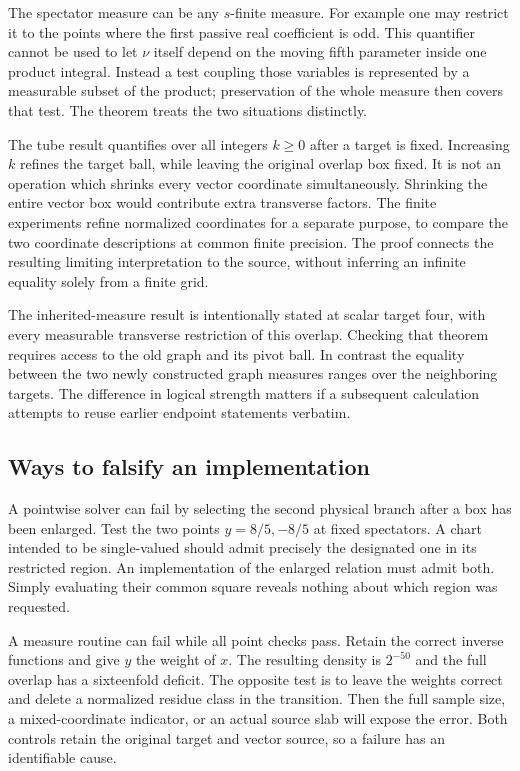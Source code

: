 \documentclass[12pt,letterpaper]{article}
\begin{document}
The spectator measure can be any $s$-finite measure. For example one may restrict it to the points where the first passive real coefficient is odd. This quantifier cannot be used to let $\nu$ itself depend on the moving fifth parameter inside one product integral. Instead a test coupling those variables is represented by a measurable subset of the product; preservation of the whole measure then covers that test. The theorem treats the two situations distinctly.

The tube result quantifies over all integers $k\ge0$ after a target is fixed. Increasing $k$ refines the target ball, while leaving the original overlap box fixed. It is not an operation which shrinks every vector coordinate simultaneously. Shrinking the entire vector box would contribute extra transverse factors. The finite experiments refine normalized coordinates for a separate purpose, to compare the two coordinate descriptions at common finite precision. The proof connects the resulting limiting interpretation to the source, without inferring an infinite equality solely from a finite grid.

The inherited-measure result is intentionally stated at scalar target four, with every measurable transverse restriction of this overlap. Checking that theorem requires access to the old graph and its pivot ball. In contrast the equality between the two newly constructed graph measures ranges over the neighboring targets. The difference in logical strength matters if a subsequent calculation attempts to reuse earlier endpoint statements verbatim.

\subsection{Ways to falsify an implementation}
A pointwise solver can fail by selecting the second physical branch after a box has been enlarged. Test the two points $y=8/5,-8/5$ at fixed spectators. A chart intended to be single-valued should admit precisely the designated one in its restricted region. An implementation of the enlarged relation must admit both. Simply evaluating their common square reveals nothing about which region was requested.

A measure routine can fail while all point checks pass. Retain the correct inverse functions and give $y$ the weight of $x$. The resulting density is $2^{-50}$ and the full overlap has a sixteenfold deficit. The opposite test is to leave the weights correct and delete a normalized residue class in the transition. Then the full sample size, a mixed-coordinate indicator, or an actual source slab will expose the error. Both controls retain the original target and vector source, so a failure has an identifiable cause.
\end{document}
